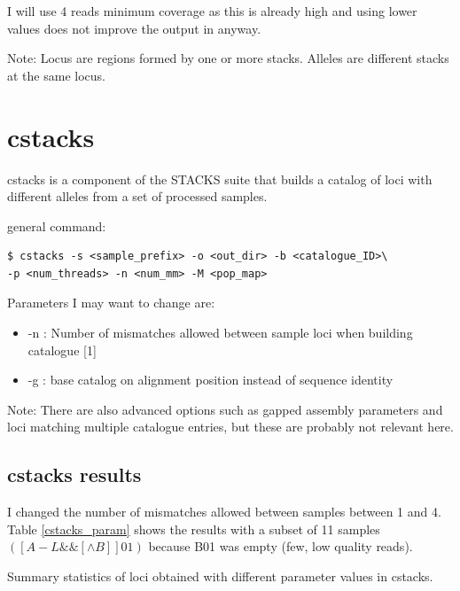 \documentclass[10pt,a4paper]{report}
\begin{document}
I will use 4 reads minimum coverage as this is already high and using lower values does not improve the output in anyway.

Note: Locus are regions formed by one or more stacks. Alleles are different stacks at the same locus.

\section{cstacks}

cstacks is a component of the STACKS suite that builds a catalog of loci with different alleles from a set of processed samples.

general command: 
\begin{lstlisting}
$ cstacks -s <sample_prefix> -o <out_dir> -b <catalogue_ID>\
-p <num_threads> -n <num_mm> -M <pop_map>
\end{lstlisting}

Parameters I may want to change are: 
\begin{itemize}
\item -n : Number of mismatches allowed between sample loci when building catalogue [1]
\item -g : base catalog on alignment position instead of sequence identity
\end{itemize}

Note: There are also advanced options such as gapped assembly parameters and loci matching multiple catalogue entries, but these are probably not relevant here.
\subsection{cstacks results}

I changed the number of mismatches allowed between samples between 1 and 4. Table \ref{cstacks_param} shows the results with a subset of 11 samples $([A-L\&\&[\wedge B]]01)$ because B01 was empty (few, low quality reads). 

\begin{table}
\begin{center}
\vspace{10px}
\vspace{10px}
\caption{Summary statistics of loci obtained with different parameter values in cstacks.}
\label{cstacks_param}
\end{center}
\end{table}
\end{document}
